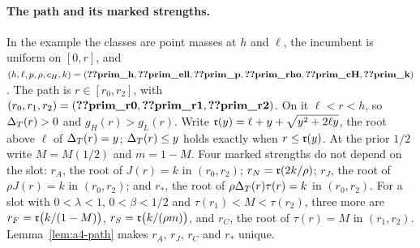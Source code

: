 \paragraph{The path and its marked strengths.}
In the example the classes are point masses at \(h\) and \(\ell\), the incumbent is uniform on \([0,r]\), and
\((h,\ell,p,\rho,c_H,k)=(\reg{prim_h},\reg{prim_ell},\reg{prim_p},\reg{prim_rho},\reg{prim_cH},\reg{prim_k})\). The path
is \(r\in[r_0,r_2]\), with \((r_0,r_1,r_2)=(\reg{prim_r0},\reg{prim_r1},\reg{prim_r2})\). On it \(\ell<r<h\), so
\(\Delta_T(r)>0\) and \(g_H(r)>g_L(r)\). Write \(\mathfrak{r}(y)=\ell+y+\sqrt{y^2+2\ell y}\), the root above \(\ell\) of \(\Delta_T(r)=y\);
\(\Delta_T(r)\le y\) holds exactly when \(r\le\mathfrak{r}(y)\). At the prior \(1/2\) write \(M=M(1/2)\) and \(m=1-M\). Four marked
strengths do not depend on the slot: \(r_A\), the root of \(J(r)=k\) in \((r_0,r_2)\); \(r_N=\mathfrak{r}(2k/\rho)\); \(r_J\),
the root of \(\rho J(r)=k\) in \((r_0,r_2)\); and \(r_*\), the root of \(\rho\Delta_T(r)\tau(r)=k\) in \((r_0,r_2)\). For a
slot with \(0<\lambda<1\), \(0<\beta<1/2\) and \(\tau(r_1)<M<\tau(r_2)\), three more are \(r_F=\mathfrak{r}\bigl(k/(1-M)\bigr)\),
\(r_S=\mathfrak{r}\bigl(k/(\rho m)\bigr)\), and \(r_C\), the root of \(\tau(r)=M\) in \((r_1,r_2)\). Lemma~\ref{lem:a4-path} makes
\(r_A\), \(r_J\), \(r_C\) and \(r_*\) unique.

